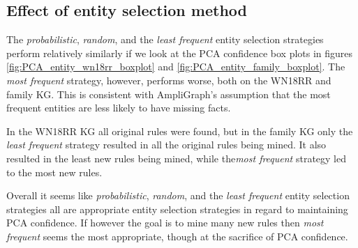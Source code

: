 \newpage
\subsection{Effect of entity selection method}
The \textit{probabilistic}, \textit{random}, and the \textit{least frequent} entity selection strategies perform relatively similarly if we look at the PCA confidence box plots in figures \ref{fig:PCA_entity_wn18rr_boxplot} and \ref{fig:PCA_entity_family_boxplot}. The \textit{most frequent} strategy, however, performs worse, both on the WN18RR and family KG. This is consistent with AmpliGraph's assumption that the most frequent entities are less likely to have missing facts.

In the WN18RR KG all original rules were found, but in the family KG only the \textit{least frequent} strategy resulted in all the original rules being mined. It also resulted in the least new rules being mined, while the\textit{most frequent} strategy led to the most new rules.

Overall it seems like \textit{probabilistic}, \textit{random}, and the \textit{least frequent} entity selection strategies all are appropriate entity selection strategies in regard to maintaining PCA confidence. If however the goal is to mine many new rules then \textit{most frequent} seems the most appropriate, though at the sacrifice of PCA confidence.

